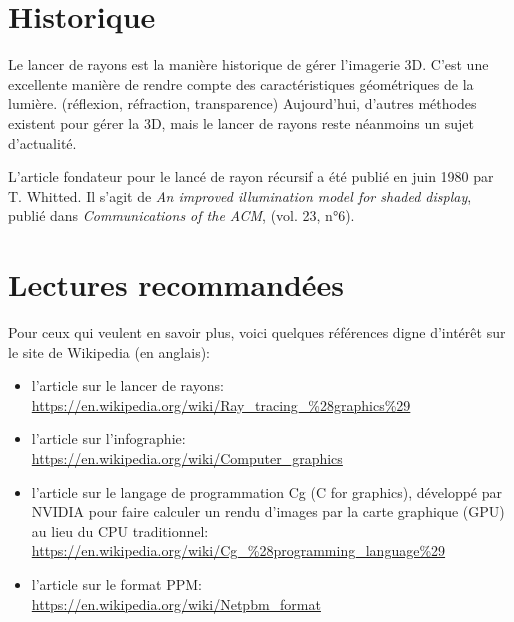 \documentclass[10pt, a4paper ]{article}
\begin{document}
\appendix

\section{Historique}

Le lancer de rayons est la manière historique de gérer l'imagerie 3D. C'est une
excellente manière de rendre compte des caractéristiques géométriques de la
lumière. (réflexion, réfraction, transparence)
Aujourd'hui, d'autres méthodes existent pour gérer la 3D, mais le lancer de
rayons reste néanmoins un sujet d'actualité.

L'article fondateur pour le lancé de rayon récursif a été publié en juin 1980
par T. Whitted.  Il s'agit de \emph{An improved illumination model for shaded
display}, publié dans \emph{Communications of the ACM}, (vol. 23, n°6).

\section{Lectures recommandées}

Pour ceux qui veulent en savoir plus, voici quelques références digne d'intérêt
sur le site de Wikipedia (en anglais):
\begin{itemize}
    \item l'article sur le lancer de rayons:\\
        \url{https://en.wikipedia.org/wiki/Ray\_tracing\_\%28graphics\%29}
    \item l'article sur l'infographie:\\
        \url{https://en.wikipedia.org/wiki/Computer\_graphics}
    \item l'article sur le langage de programmation Cg (C for graphics),
        développé par NVIDIA pour faire calculer un rendu d'images par la carte
        graphique (GPU) au lieu du CPU traditionnel:\\
        \url{https://en.wikipedia.org/wiki/Cg\_\%28programming\_language\%29}
    \item l'article sur le format PPM:\\
        \url{https://en.wikipedia.org/wiki/Netpbm_format}
\end{itemize}
\end{document}
